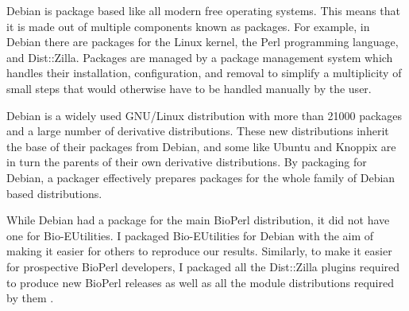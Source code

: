 Debian is package based like all modern free operating systems.
This means that it is made out of multiple components known as
packages.  For example, in Debian there are packages for the Linux
kernel, the Perl programming language, and Dist::Zilla.  Packages are
managed by a package management system which handles their
installation, configuration, and removal to simplify
a multiplicity of small steps that would otherwise
have to be handled manually by the user.


Debian is a widely used GNU/Linux
distribution with more than 21000 packages and a large
number of derivative distributions.  These new distributions
inherit the base of their packages from Debian, and some like Ubuntu
and Knoppix are in turn the parents of their own derivative
distributions.  By packaging
for Debian, a packager effectively prepares packages for the whole family of
Debian based distributions.

While Debian had a package for the main BioPerl distribution, it did
not have one for Bio-EUtilities.  I packaged Bio-EUtilities for
Debian with the aim of making it easier for
others to reproduce our results.
Similarly, to make it easier for prospective BioPerl
developers, I packaged all the Dist::Zilla plugins required to produce
new BioPerl releases as well
as all the module distributions required by them
.

